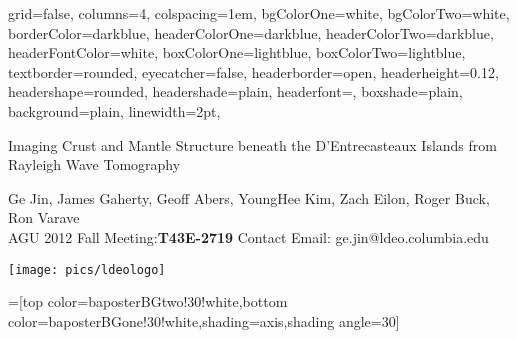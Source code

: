 \documentclass[paperwidth=65in,paperheight=43in,landscape,final,fontscale=0.30]{baposter}
\begin{document}
\begin{poster}{
  grid=false,
  columns=4,
  colspacing=1em,
  bgColorOne=white,
  bgColorTwo=white,
  borderColor=darkblue,
  headerColorOne=darkblue,
  headerColorTwo=darkblue,
  headerFontColor=white,
  boxColorOne=lightblue,
  boxColorTwo=lightblue,
  textborder=rounded,
  eyecatcher=false,
  headerborder=open,
  headerheight=0.12\textheight,  %
  headershape=rounded,
  headershade=plain,
  headerfont=\LARGE\textsf, %
  boxshade=plain,
  background=plain,
  linewidth=2pt,
  }
  {} %
  {\sf %
  \vspace{0.8em}

  Imaging Crust and Mantle Structure beneath the D'Entrecasteaux 
  Islands from Rayleigh Wave Tomography}
  {\sf %
  Ge Jin, James Gaherty, Geoff Abers, YoungHee Kim, Zach Eilon, Roger Buck, Ron Varave \\
  \small{ AGU 2012 Fall Meeting:\textbf{T43E-2719} Contact Email: ge.jin@ldeo.columbia.edu}
    }
  {
  {\begin{minipage}{35em}
	  \vfill
	  \hfill
		\texttt{[image: pics/ldeologo]}
  \end{minipage}}
  }

  =[top color=baposterBGtwo!30!white,bottom color=baposterBGone!30!white,shading=axis,shading angle=30]

     \newlength{\leftimgwidth}
     \setlength{\leftimgwidth}{0.78em+8.0em}


\end{poster}
\end{document}
